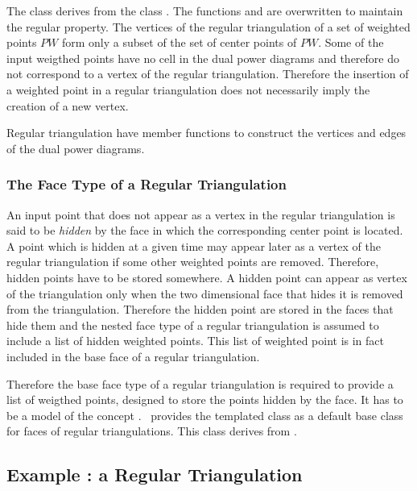 The class 
derives from the class .
The functions  and 
 are overwritten to maintain the regular
property.
The vertices of the regular triangulation
of a set of weighted points ${  PW}$ form only a subset
of the set of center points of ${   PW}$.
Some of the input
weigthed points have no cell in the dual power diagrams
and therefore do not correspond to a vertex of the regular
triangulation.
Therefore the  insertion of a weighted point  in a regular triangulation
does not necessarily imply the creation of a new vertex.

Regular triangulation have member functions to construct
the vertices and edges of the dual power diagrams.


\subsubsection{The Face Type of a Regular Triangulation}

An input  point that does not appear as a vertex in the
regular triangulation is said to be {\it hidden }
by the face in which the corresponding center point is located.
A  point which is hidden at a given time may appear later as a vertex of
the regular triangulation if some other weighted points are removed.
Therefore, hidden points have to be stored somewhere.
A hidden point can appear as vertex of the triangulation
only when the
two dimensional face that hides it
is removed from the triangulation. 
Therefore the  hidden point are stored
in the faces that  hide them and the nested face type of a 
regular triangulation is assumed to include a list of hidden 
weighted points. This list of weighted point is in fact included
in the base face of a regular triangulation.

Therefore the base face type of a regular triangulation
is required to provide a list of weigthed points,
designed to store the points hidden by the face. It has to be a model
of the concept .
\cgal\ provides the templated class 
as a default base class for faces of regular triangulations.
This class  derives from .


\subsection{Example : a Regular Triangulation}
\label{Subsection_2D_Triangulations_Regular_Example}

